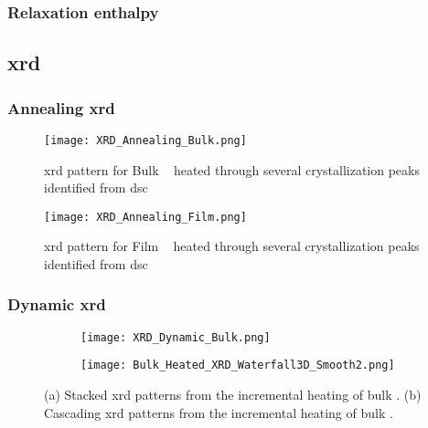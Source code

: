 \documentclass[draft,a4paper,12pt,oneside]{article}%
\begin{document}
\subsubsection{Relaxation enthalpy}

\subsection{\acrshort{xrd}}
\subsubsection{Annealing \acrshort{xrd}}

\begin{figure}[b]
	\centering
	\texttt{[image: XRD\_Annealing\_Bulk.png]}
	\caption[Table of contents Capition]{\acrshort{xrd} pattern for Bulk \MgZnCa~ heated through several crystallization peaks identified from \acrshort{dsc}}
	\label{fig:XRD_Annealing_Bulk}
\end{figure}

\begin{figure}[b]
	\centering
	\texttt{[image: XRD\_Annealing\_Film.png]}
	\caption[Table of contents Capition]{\acrshort{xrd} pattern for Film \MgZnCa~ heated through several crystallization peaks identified from \acrshort{dsc}}
	\label{fig:XRD_Annealing_Film}
\end{figure}

\subsubsection{Dynamic \acrshort{xrd}}

\begin{figure}[b]
	\centering
	\begin{subfigure}[htbp]{0.75\textwidth}
		\texttt{[image: XRD\_Dynamic\_Bulk.png]}
		\caption{}
		\label{fig:XRD_Dynamic_FullStack_Bulk}
	\end{subfigure}
	\begin{subfigure}[htbp]{0.75\textwidth}
		\texttt{[image: Bulk\_Heated\_XRD\_Waterfall3D\_Smooth2.png]}
		\caption{}
		\label{fig:XRD_Dynamic_WaterFall_Bulk}
	\end{subfigure}
	\caption{(a) Stacked \gls{xrd} patterns from the incremental heating of bulk \MgZnCa. (b) Cascading \gls{xrd} patterns from the incremental heating of bulk \MgZnCa. }%
	\label{fig:XRD_Dynamic_Bulk}
\end{figure}
\end{document}
